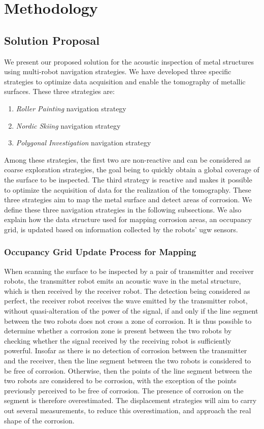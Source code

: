 
\chapter{Methodology}

\section{Solution Proposal}

We present our proposed solution for the acoustic inspection of metal structures using multi-robot navigation strategies.
We have developed three specific strategies to optimize data acquisition and enable the tomography of metallic surfaces.
These three strategies are:
\begin{enumerate}
	\item \textit{Roller Painting} navigation strategy
	\item \textit{Nordic Skiing} navigation strategy
	\item \textit{Polygonal Investigation} navigation strategy
\end{enumerate}
Among these strategies, the first two are non-reactive and can be considered as coarse exploration strategies, the goal being to quickly obtain a global coverage of the surface to be inspected.
The third strategy is reactive and makes it possible to optimize the acquisition of data for the realization of the tomography.
These three strategies aim to map the metal surface and detect areas of corrosion.
We define these three navigation strategies in the following subsections.
We also explain how the data structure used for mapping corrosion areas, an occupancy grid, is updated based on information collected by the robots' \gls{ugw} sensors.

\subsection{Occupancy Grid Update Process for Mapping}

When scanning the surface to be inspected by a pair of transmitter and receiver robots, the transmitter robot emits an acoustic wave in the metal structure, which is then received by the receiver robot.
The detection being considered as perfect, the receiver robot receives the wave emitted by the transmitter robot, without quasi-alteration of the power of the signal, if and only if the line segment between the two robots does not cross a zone of corrosion.
It is thus possible to determine whether a corrosion zone is present between the two robots by checking whether the signal received by the receiving robot is sufficiently powerful.
Insofar as there is no detection of corrosion between the transmitter and the receiver, then the line segment between the two robots is considered to be free of corrosion.
Otherwise, then the points of the line segment between the two robots are considered to be corrosion, with the exception of the points previously perceived to be free of corrosion.
The presence of corrosion on the segment is therefore overestimated.
The displacement strategies will aim to carry out several measurements, to reduce this overestimation, and approach the real shape of the corrosion.

